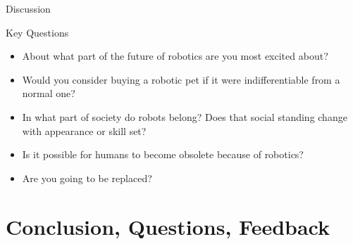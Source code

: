 \documentclass[usenames,dvipsnames,10pt]{beamer}
\begin{document}
    \begin{frame}{Discussion}
        \begin{exampleblock}{Key Questions}
            \begin{itemize}
                \item About what part of the future of robotics are you most excited about?
                \item Would you consider buying a robotic pet if it were indifferentiable from a normal one?
                \item In what part of society do robots belong? Does that social standing change with appearance or skill set?
                \item Is it possible for humans to become obsolete because of robotics?
                \item Are you going to be replaced?
            \end{itemize}
        \end{exampleblock}
    \end{frame}
    
    
    \section{Conclusion, Questions, Feedback}
    
    



    
\end{document}
